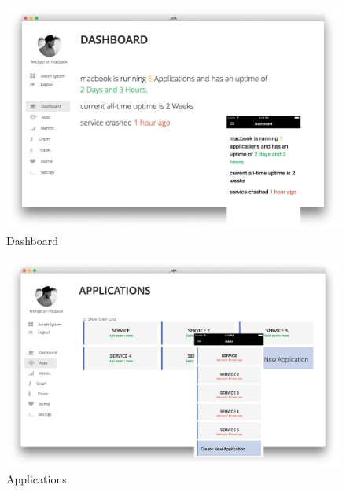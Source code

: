 \begin{figure}[h]
 \centering
 \includegraphics[width=0.9\linewidth]{appendix/app/dashboard.png}
 \caption{Dashboard}
\end{figure}

\begin{figure}[h]
 \centering
 \includegraphics[width=0.9\linewidth]{appendix/app/apps.png}
 \caption{Applications}
\end{figure}

